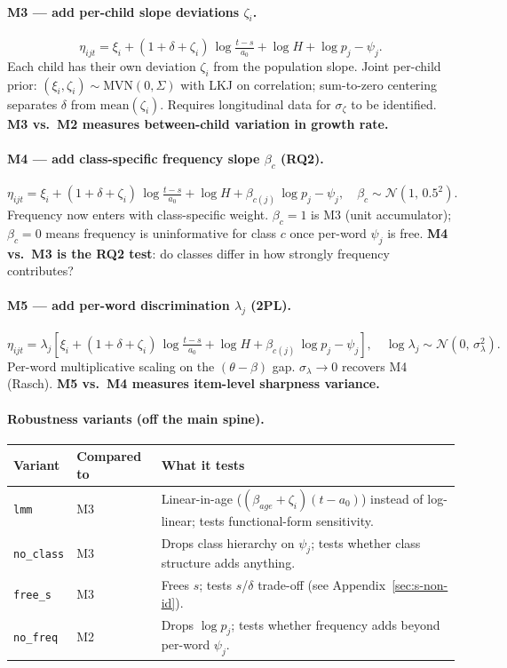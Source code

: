 \documentclass[11pt]{article}
\newcommand{\Norm}{\mathcal{N}}
\begin{document}
\paragraph{M3 — add per-child slope deviations \(\zeta_i\).}
\[
\eta_{ijt} = \xi_i + (1 + \delta + \zeta_i)\,\log\!\tfrac{t-s}{a_0} + \log H + \log p_j - \psi_j.
\]
Each child has their own deviation \(\zeta_i\) from the population
slope. Joint per-child prior:
\((\xi_i, \zeta_i) \sim \mathrm{MVN}(0,\Sigma)\) with LKJ on
correlation; sum-to-zero centering separates \(\delta\) from
\(\mathrm{mean}(\zeta_i)\). Requires longitudinal data for
\(\sigma_\zeta\) to be identified. \textbf{M3 vs.\ M2 measures
between-child variation in growth rate.}

\paragraph{M4 — add class-specific frequency slope \(\beta_c\) (RQ2).}
\[
\eta_{ijt} = \xi_i + (1 + \delta + \zeta_i)\,\log\!\tfrac{t-s}{a_0} + \log H + \beta_{c(j)}\,\log p_j - \psi_j,
\quad \beta_c \sim \Norm(1,\,0.5^2).
\]
Frequency now enters with class-specific weight. \(\beta_c = 1\) is
M3 (unit accumulator); \(\beta_c = 0\) means frequency is uninformative
for class \(c\) once per-word \(\psi_j\) is free.
\textbf{M4 vs.\ M3 is the RQ2 test}: do classes differ in how
strongly frequency contributes?

\paragraph{M5 — add per-word discrimination \(\lambda_j\) (2PL).}
\[
\eta_{ijt} = \lambda_j\!\left[\xi_i + (1 + \delta + \zeta_i)\,\log\!\tfrac{t-s}{a_0} + \log H + \beta_{c(j)}\,\log p_j - \psi_j\right],
\quad \log \lambda_j \sim \Norm(0,\,\sigma_\lambda^2).
\]
Per-word multiplicative scaling on the \((\theta - \beta)\) gap.
\(\sigma_\lambda \to 0\) recovers M4 (Rasch).  \textbf{M5 vs.\ M4
measures item-level sharpness variance.}

\paragraph{Robustness variants (off the main spine).}

\begin{center}
\small
\begin{tabular}{@{}lll@{}}
\toprule
Variant & Compared to & What it tests \\
\midrule
\texttt{lmm}     & M3 & Linear-in-age (\((\beta_{age} + \zeta_i)(t - a_0)\)) instead of log-linear; tests functional-form sensitivity. \\
\texttt{no\_class} & M3 & Drops class hierarchy on \(\psi_j\); tests whether class structure adds anything. \\
\texttt{free\_s}  & M3 & Frees \(s\); tests \(s\)/\(\delta\) trade-off (see Appendix~\ref{sec:s-non-id}). \\
\texttt{no\_freq} & M2 & Drops \(\log p_j\); tests whether frequency adds beyond per-word \(\psi_j\). \\
\bottomrule
\end{tabular}
\end{center}
\end{document}
